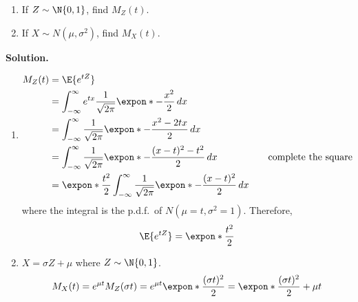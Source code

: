 \begin{Example}{}{}
    \begin{enumerate}[label=(\roman*)]
        \item If $ Z \sim \N{0,1} $, find $ M_Z(t) $.
        \item If $ X \sim N(\mu,\sigma^2) $, find $ M_X(t) $.
    \end{enumerate}
    \textbf{Solution.}
    \begin{enumerate}[label=(\roman*)]
        \item \begin{align*}
                  M_Z(t)
                                                           & =\E{e^{tZ}}                                                                        \\
                                                           & =\int_{-\infty}^{\infty} e^{tx} \frac{1}{\sqrt{2\pi}}
                  \expon*{-\frac{x^2}{2}} \, d{x}                                                                                               \\
                                                           & =\int_{-\infty}^{\infty} \frac{1}{\sqrt{2\pi}}
                  \expon*{ -\frac{x^2-2tx}{2}} \, d{x}                                                                                          \\
                                                           & =\int_{-\infty}^{\infty} \frac{1}{\sqrt{2\pi}}
                  \expon*{ -\frac{(x-t)^2-t^2}{2}} \, d{x} & \quad                                                 & \text{complete the square} \\
                                                           & = \expon*{ \frac{t^2}{2}}
                  \int_{-\infty}^{\infty} \frac{1}{\sqrt{2\pi}}
                  \expon*{ -\frac{(x-t)^2}{2} } \, d{x}
              \end{align*}
              where the integral is the p.d.f.\ of $ N(\mu=t,\sigma^2=1) $. Therefore,
              \[ \E{e^{tZ}}= \expon*{ \frac{t^2}{2}} \]

        \item $ X=\sigma Z+\mu $ where $ Z \sim \N{0,1} $.
              \[
                  M_X(t)
                  =e^{\mu t}M_Z(\sigma t)
                  =e^{\mu t} \expon*{ \frac{(\sigma t)^2}{2}}
                  = \expon*{ \frac{(\sigma t)^2}{2} +\mu t}
              \]
    \end{enumerate}
\end{Example}

